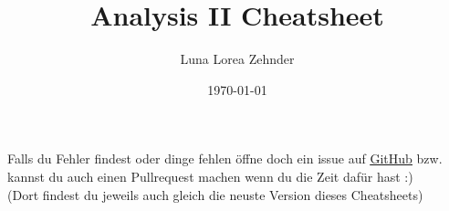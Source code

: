 \documentclass[8pt]{article}
\title{Analysis II Cheatsheet}
\author{Luna Lorea Zehnder}
\date{\today}
\begin{document}
\begin{multicols*}{3}
  \maketitle %
  Falls du Fehler findest oder dinge fehlen öffne doch ein issue auf \color{Maroon4}\href{https://github.com/LunaLorea/Analysis-II-Cheatsheet}{\underline{GitHub}}\color{defaultcolor}  \;bzw. kannst du auch einen Pullrequest machen wenn du die Zeit dafür hast :)\\
  (Dort findest du jeweils auch gleich die neuste Version dieses Cheatsheets)
  
  
  
\end{multicols*}
\end{document}
